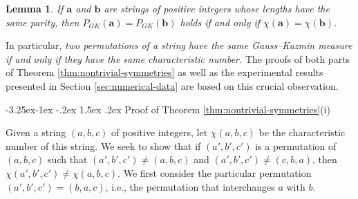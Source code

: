 \documentclass[10pt]{article}
\makeatletter
\renewcommand\subsection{\@startsection{subsection}{2}{\z@}
{-3.25ex\@plus -1ex \@minus -.2ex}
{1.5ex \@plus .2ex}
{\normalfont\normalsize\bfseries\boldmath}}
\newtheorem{lemma}{Lemma}
\theoremstyle{definition}
\numberwithin{equation}{section}
\numberwithin{lemma}{section}
\newcommand{\bfa}{\mathbf{a}}
\newcommand{\bfb}{\mathbf{b}}
\makeatother
\begin{document}
\begin{lemma}
\label{lem:char-number}
If $\bfa$ and $\bfb$ are strings of positive integers whose lengths have
the same parity, then
$P_{GK}(\bfa)=P_{GK}(\bfb)$ holds if and only if
$\chi(\bfa)=\chi(\bfb)$.
\end{lemma}

In particular, \emph{two permutations of a string have the same
Gauss--Kuzmin measure if and only if they have the same characteristic
number.} The proofs of both parts of 
Theorem \ref{thm:nontrivial-symmetries} as well as
the experimental results presented in 
Section \ref{sec:numerical-data} are based on this crucial observation.



\subsection{Proof of Theorem \ref{thm:nontrivial-symmetries}(i)}


Given a string $(a,b,c)$ of positive integers, let $\chi(a,b,c)$ be
the characteristic number of this string. We seek to show that if  
$(a',b',c')$ is a permutation of $(a,b,c)$ such that 
$(a',b',c')\not=(a,b,c)$ and $(a',b',c')\not=(c,b,a)$,
then $\chi(a',b',c')\not=\chi(a,b,c)$.  We first consider the particular
permutation $(a',b',c')=(b,a,c)$, i.e., the permutation that
interchanges $a$ with $b$.
\end{document}

